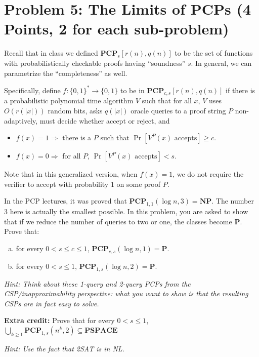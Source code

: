 \documentclass{article}
\newcommand{\mf}[1]{\mathbf{#1}}
\begin{document}
\section*{Problem 5: The Limits of PCPs (4 Points, 2 for each sub-problem)}
Recall that in class we defined $\mf{PCP}_s[r(n),q(n)]$ to be the set of functions with probabilistically checkable proofs having ``soundness'' $s$. In general, we can parametrize the ``completeness'' as well. 

Specifically, define $f:\{0,1\}^* \rightarrow \{0,1\}$ to be in $\mf{PCP}_{c,s}[r(n),q(n)]$ if there is a probabilistic polynomial time algorithm $V$ such that for all $x$, $V$ uses $O(r(|x|))$ random bits, asks $q(|x|)$ oracle queries to a proof string $P$ non-adaptively, must decide whether accept or reject, and
\begin{itemize}
	\item
	$f(x) = 1 \Longrightarrow$ there is a $P$ such that $\Pr[V^P(x) \textrm{ accepts}] \geq c$.
	\item
	$f(x) = 0 \Longrightarrow$ for all $P$, $\Pr[V^P(x) \textrm{ accepts}] < s$.
\end{itemize}

Note that in this generalized version, when $f(x) = 1$, we do not require the verifier to accept with probability $1$ on some proof $P$. 

In the PCP lectures, it was proved that $\mf{PCP}_{1,1}(\log n, 3)=\mathbf{NP}$. The number $3$ here is actually the smallest possible. In this problem, you are asked to show that if we reduce the number of queries to two or one, the classes become $\mathbf{P}$. Prove that:
\begin{enumerate}[(a)]
	\item
	for every $0<s\leq  c\leq 1$, $\mf{PCP}_{c,s}(\log n,1)=\mathbf{P}$.
	\item
	for every $0<s\leq 1$, $\mf{PCP}_{1,s}(\log n,2)=\mathbf{P}$.
\end{enumerate} 
\emph{Hint: Think about these 1-query and 2-query PCPs from the CSP/inapproximability perspective: what you want to show is that the resulting CSPs are in fact easy to solve.}

\smallskip

{\bf Extra credit:} Prove that for every $0<s\leq 1$, $\bigcup_{k \geq 1} \mf{PCP}_{1,s}(n^k,2) \subseteq \mf{PSPACE}$

\smallskip

\emph{Hint: Use the fact that 2SAT is in NL.} 
\end{document}
